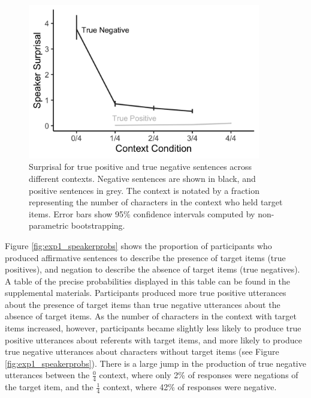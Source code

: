 \documentclass[man, floatsintext, noapacite]{apa6}
\begin{document}
\begin{figure}[t]
\begin{center} 
\includegraphics[width=4in]{figures/experiment1/speaker_surprisal.png}
\caption{\label{fig:exp1_speakersurprise} Surprisal for true positive and true negative sentences across different contexts. Negative sentences are shown in black, and positive sentences in grey.  The context is notated by a fraction representing the number of characters in the context who held target items. Error bars show 95\% confidence intervals computed by non-parametric bootstrapping.  }
\end{center} 
\end{figure}

Figure \ref{fig:exp1_speakerprobs} shows the proportion of participants who produced affirmative sentences to describe the presence of target items (true positives), and negation to describe the absence of target items (true negatives). A table of the precise probabilities displayed in this table can be found in the supplemental materials. Participants produced more true positive utterances about the presence of target items than true negative utterances about the absence of target items. As the number of characters in the context with target items increased, however, participants became slightly less likely to produce true positive utterances about referents with target items, and more likely to produce true negative utterances about characters without target items (see Figure \ref{fig:exp1_speakerprobs}). There is a large jump in the production of true negative utterances between the $\frac{0}{4}$ context, where only 2\% of responses were negations of the target item, and the $\frac{1}{4}$ context, where 42\% of responses were negative. 
\end{document}
